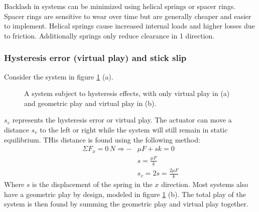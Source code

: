 \documentclass[11pt, a4paper]{article}
\numberwithin{equation}{section}
\numberwithin{figure}{section}
\begin{document}
Backlash in systems can be minimized using helical springs or spacer rings. Spacer rings are sensitive to wear over time but are generally cheaper and easier to implement. Helical springs cause increased internal loads and higher losses due to friction. Additionally springs only reduce clearance in 1 direction.


\subsubsection{Hysteresis error (virtual play) and stick slip}
Consider the system in figure \ref{fig:hysteresis} (a).
\begin{figure}[H]
  \centering
  \qquad
  \caption{A system subject to hysteresis effects, with only virtual play in (a) and geometric play and virtual play in (b).}
  \label{fig:hysteresis}
\end{figure}
$s_v$ represents the hysteresis error or virtual play. The actuator can move a distance $s_v$ to the left or right while the system will still remain in static equilibrium. THis distance is found using the following method:
\begin{align}
  \Sigma F_x = 0\,N \Rightarrow -&\mu F + sk = 0\\
                                 &s = \frac{\mu F}{k}\\
                                 &s_v = 2s = \frac{2\mu F}{k}
\end{align}
Where $s$ is the displacement of the spring in the $x$ direction. Most systems also have a geometric play by design, modeled in figure \ref{fig:hysteresis} (b). The total play of the system is then found by summing the geometric play and virtual play together.\\
\end{document}

